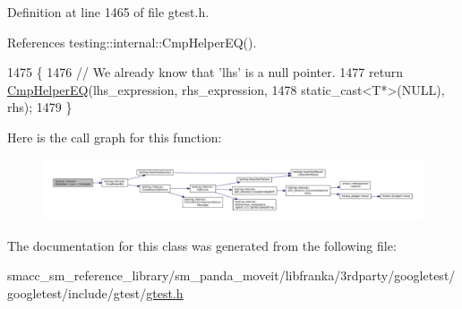 Definition at line 1465 of file gtest.\+h.



References testing\+::internal\+::\+Cmp\+Helper\+E\+Q().


\begin{DoxyCode}
1475               \{
1476     \textcolor{comment}{// We already know that 'lhs' is a null pointer.}
1477     \textcolor{keywordflow}{return} \hyperlink{namespacetesting_1_1internal_a4638c74d9b32e971f9b321af6fafc2f1}{CmpHelperEQ}(lhs\_expression, rhs\_expression,
1478                        static\_cast<T*>(NULL), rhs);
1479   \}
\end{DoxyCode}
Here is the call graph for this function\+:
\nopagebreak
\begin{figure}[H]
\begin{center}
\leavevmode
\includegraphics[width=350pt]{classtesting_1_1internal_1_1EqHelper_3_01true_01_4_a6f292601a68c8f0d49e6d48bd309b900_cgraph}
\end{center}
\end{figure}


The documentation for this class was generated from the following file\+:\begin{DoxyCompactItemize}
\item 
smacc\+\_\+sm\+\_\+reference\+\_\+library/sm\+\_\+panda\+\_\+moveit/libfranka/3rdparty/googletest/googletest/include/gtest/\hyperlink{gtest_8h}{gtest.\+h}\end{DoxyCompactItemize}
